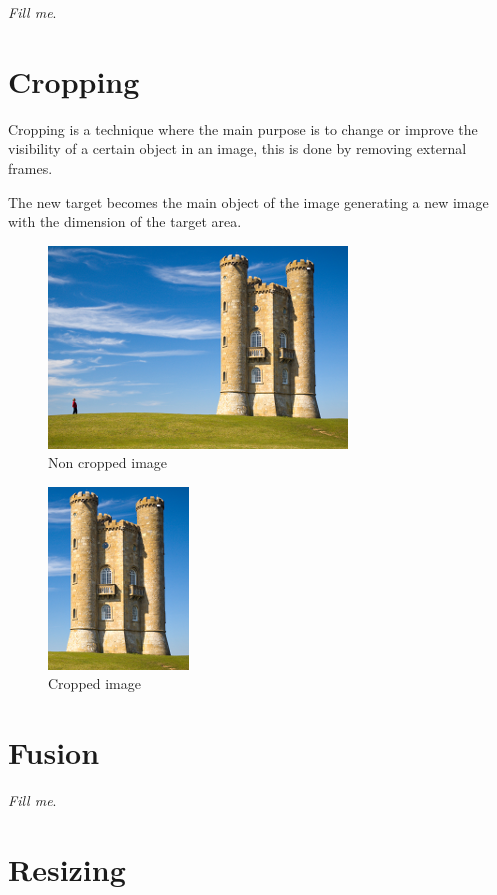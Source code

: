 \documentclass{article}
\begin{document}
		\textit{Fill me}.

\section{Cropping}

	Cropping is a technique where the main purpose is to change or improve the visibility of a certain object in an image, 
	this is done by removing external frames. 

	The new target becomes the main object of the image generating a new image with the dimension of the target area.  

	\begin{figure} [H]
		\centering
		\includegraphics[scale=1]{images/crop_1}
		\caption{Non cropped image \label{crop_1}}
	\end{figure}

	\begin{figure} [H]
		\centering
		\includegraphics[scale=1]{images/crop_2}
		\caption{Cropped image \label{crop_2}}
	\end{figure}

\section{Fusion}

	\textit{Fill me}.

\section{Resizing}
\end{document}

